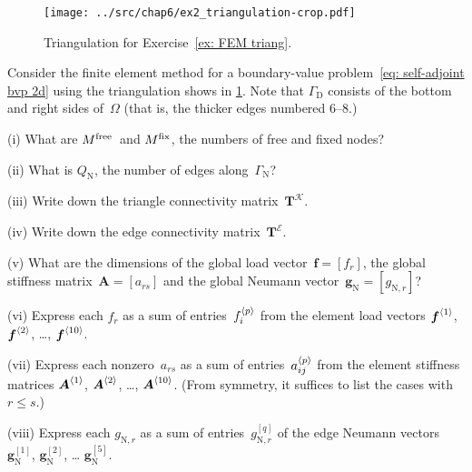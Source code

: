 \begin{Exercises}
\begin{figure}
\caption{Triangulation for Exercise~\ref{ex: FEM triang}.}
\label{fig: FEM triang}
\begin{center}
\texttt{[image: ../src/chap6/ex2\_triangulation-crop.pdf]}
\end{center}
\end{figure}

\exercise\label{ex: FEM triang}
Consider the finite element method for a boundary-value 
problem~\eqref{eq: self-adjoint bvp 2d} using the triangulation shows in 
\cref{fig: FEM triang}.  Note that $\Gamma_{\mathrm{D}}$ consists of the bottom
and right sides of~$\Omega$ (that is, the thicker edges numbered $6$--$8$.)
\begin{description}
\item{(i)} What are $M^{\mathrm{free}}$~and $M^{\mathrm{fix}}$, the numbers of free and fixed nodes?
\item{(ii)} What is $Q_{\mathrm{N}}$, the number of edges 
along~$\Gamma_{\mathrm{N}}$?
\item{(iii)} Write down the triangle connectivity 
matrix~$\boldsymbol{T}^{\mathcal{K}}$.
\item{(iv)} Write down the edge connectivity 
matrix~$\boldsymbol{T}^{\mathcal{E}}$.
\item{(v)} What are the dimensions of the global load 
vector~$\boldsymbol{f}=[f_r]$, the global stiffness 
matrix~$\boldsymbol{A}=[a_{rs}]$ and the global Neumann 
vector~$\boldsymbol{g}_{\mathrm{N}}=[g_{\mathrm{N},r}]$?
\item{(vi)} Express each $f_r$ as a sum of entries~$f^{\langle p\rangle}_i$ from the 
element load vectors $\boldsymbol{f}^{\langle1\rangle}$, $\boldsymbol{f}^{\langle2\rangle}$, \dots,
$\boldsymbol{f}^{\langle10\rangle}$.
\item{(vii)} Express each nonzero~$a_{rs}$ as a sum of entries~$a^{\langle p\rangle}_{ij}$
from the element stiffness matrices $\boldsymbol{A}^{\langle1\rangle}$, 
$\boldsymbol{A}^{\langle2\rangle}$, \dots, $\boldsymbol{A}^{\langle10\rangle}$.  (From symmetry, it 
suffices to list the cases with $r\le s$.)
\item{(viii)} Express each $g_{\mathrm{N},r}$ as a sum of 
entries~$g^{[q]}_{\mathrm{N},r}$ of the edge Neumann vectors 
$\boldsymbol{g}^{[1]}_{\mathrm{N}}$, $\boldsymbol{g}^{[2]}_{\mathrm{N}}$, \dots
$\boldsymbol{g}^{[5]}_{\mathrm{N}}$.
\end{description}

\end{Exercises}
